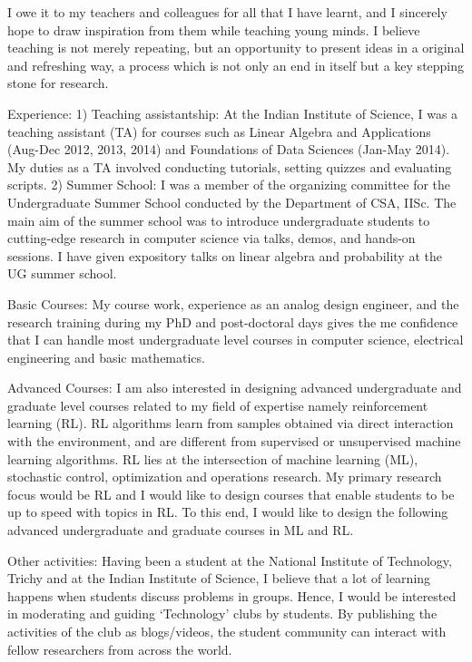 I owe it to my teachers and colleagues for all that I have learnt, and I sincerely hope to draw inspiration from them while teaching young minds. 
I believe teaching is not merely repeating, but an opportunity to present ideas in a original and refreshing way, a process which is not only an end in itself but a key stepping stone for research.   \par

Experience:  
1) Teaching assistantship: At the Indian Institute of Science, I was a teaching assistant (TA) for courses such as Linear Algebra and Applications (Aug-Dec 2012, 2013, 2014) and Foundations of Data Sciences (Jan-May 2014).  My duties as a TA involved conducting tutorials, setting quizzes and evaluating scripts.
2) Summer School: I  was a member of the organizing committee for the Undergraduate Summer School  conducted by the Department of CSA, IISc. The main aim of the summer school was to introduce undergraduate students to cutting-edge research in computer science via  talks, demos, and hands-on sessions. I have given expository talks on linear algebra and probability at the UG summer school. 

Basic Courses: My course work, experience as an analog design engineer, and the research training during my PhD and post-doctoral days gives the me confidence that  I can handle most undergraduate level courses in computer science, electrical engineering and basic mathematics.

Advanced Courses: I am also interested in designing advanced undergraduate and graduate level courses related to my field of expertise namely reinforcement learning (RL).
RL algorithms learn from samples obtained via direct interaction with the environment, and are different from supervised or unsupervised machine learning algorithms.  RL lies at the intersection of machine learning (ML), stochastic control, optimization and operations research. My primary research focus would be RL and I would like to design courses that enable students to be up to speed with topics in RL. To this end, I would like to design the following advanced undergraduate and graduate courses in ML and RL.

Other activities: Having been a student at the National Institute of Technology, Trichy and at the Indian Institute of Science, I believe that a lot of learning happens when students discuss problems in groups. Hence, I would be interested in moderating and guiding `Technology' clubs by students. By publishing the activities of the club as blogs/videos, the student community can interact with fellow researchers from across the world.


